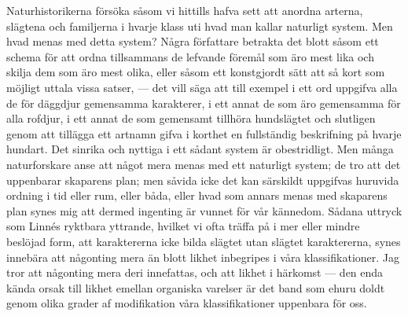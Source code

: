 Naturhistorikerna försöka såsom vi hittills hafva sett att anordna arterna, slägtena och familjerna i hvarje klass uti hvad man kallar naturligt system. Men hvad menas med detta system? Några författare betrakta det blott såsom ett schema för att ordna tillsammans de lefvande föremål som äro mest lika och skilja dem som äro mest olika, eller såsom ett konstgjordt sätt att så kort som möjligt uttala vissa satser, — det vill säga att till exempel i ett ord uppgifva alla de för däggdjur gemensamma karakterer, i ett annat de som äro gemensamma för alla rofdjur, i ett annat de som gemensamt tillhöra hundslägtet och slutligen genom att tillägga ett artnamn gifva i korthet en fullständig beskrifning på hvarje hundart. Det sinrika och nyttiga i ett sådant system är obestridligt. Men många naturforskare anse att något mera menas med ett naturligt system; de tro att det uppenbarar skaparens plan; men såvida icke det kan särskildt uppgifvas huruvida ordning i tid eller rum, eller båda, eller hvad som annars menas med skaparens plan synes mig att dermed ingenting är vunnet för vår kännedom. Sådana uttryck som Linnés ryktbara yttrande, hvilket vi ofta träffa på i mer eller mindre beslöjad form, att karaktererna icke bilda slägtet utan slägtet karaktererna, synes innebära att någonting mera än blott likhet inbegripes i våra klassifikationer. Jag tror att någonting mera deri innefattas, och att likhet i härkomst — den enda kända orsak till likhet emellan organiska varelser är det band som ehuru doldt genom olika grader af modifikation våra klassifikationer uppenbara för oss.

